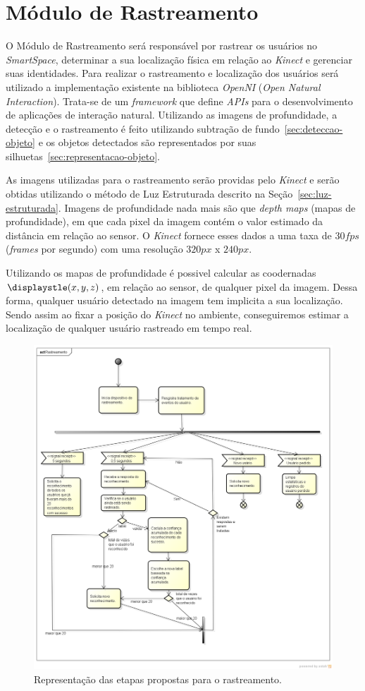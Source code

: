 \section{Módulo de Rastreamento}

	O Módulo de Rastreamento será responsável por rastrear os usuários no
	\textit{SmartSpace}, determinar a sua localização física em relação
	ao \textit{Kinect} e gerenciar suas identidades. Para realizar o rastreamento e
	localização dos usuários será utilizado a implementação existente na
	biblioteca \textit{OpenNI} (\textit{Open Natural Interaction}). Trata-se de um
	\textit{framework} que define \textit{APIs} para o desenvolvimento de
	aplicações de interação natural. Utilizando as imagens de
	profundidade, a detecção e o rastreamento é feito utilizando
	subtração de fundo~\ref{sec:deteccao-objeto} e os objetos detectados são
	representados por suas silhuetas~\ref{sec:representacao-objeto}.

	As imagens utilizadas para o rastreamento serão providas pelo \textit{Kinect} 
	e serão obtidas utilizando o método de Luz Estruturada descrito na
	Seção~\ref{sec:luz-estruturada}. Imagens de profundidade nada mais são que
	\textit{depth maps} (mapas de profundidade), em que cada pixel da imagem
	contém o valor estimado da distância em relação ao sensor. O \textit{Kinect}
	fornece esses dados a uma taxa de $\displaystyle 30 fps$ (\textit{frames} por
	segundo) com uma resolução $\displaystyle 320px$ x $\displaystyle 240px$.
	
	Utilizando os mapas de profundidade é possivel calcular as coodernadas
	$\displaystle (x,y,z)$, em relação ao sensor, de qualquer pixel da imagem.
	Dessa forma, qualquer usuário detectado na imagem tem implicita a sua
	localização. Sendo assim ao fixar a posição do \textit{Kinect} no
	ambiente, conseguiremos estimar a localização de qualquer usuário rastreado em
	tempo real.
	
	\begin{figure}[H]
		\begin{center}
			\includegraphics[scale=0.45]{figuras/4.ProblemaEProposta/Rastreamento.png}
		\end{center}
		\caption{Representação das etapas propostas para o rastreamento.}
		\label{fig:processo-rastreamento}
	\end{figure}
